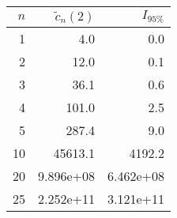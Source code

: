 \begin{tabular}{rrr}
\toprule
 $n$ &  $\tilde{c}_n(2)$ &  $I_{95\%}$ \\
\midrule
   1 &               4.0 &         0.0 \\
   2 &              12.0 &         0.1 \\
   3 &              36.1 &         0.6 \\
   4 &             101.0 &         2.5 \\
   5 &             287.4 &         9.0 \\
  10 &           45613.1 &      4192.2 \\
  20 &         9.896e+08 &   6.462e+08 \\
  25 &         2.252e+11 &   3.121e+11 \\
\bottomrule
\end{tabular}
